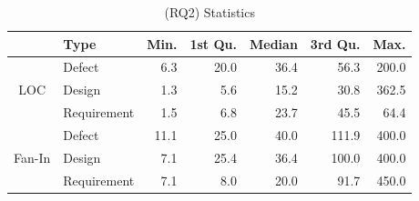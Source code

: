 \begin{table}[tb]
  \caption{(RQ2) Statistics}
  \label{tab:statistic_type}
  \centering

  \begin{tabular}{cl|rrrrr}
  \hline
      &  Type & Min. & 1st Qu. & Median & 3rd Qu. & Max. \\
  \hline
        & Defect    & 6.3 &  20.0 &  36.4  &   56.3 &  200.0 \\
   LOC  & Design & 1.3 &   5.6 &  15.2  &   30.8 & 362.5 \\
        & Requirement  & 1.5 &   6.8 &  23.7  &   45.5 &  64.4 \\
  \hline
        & Defect    & 11.1 &  25.0 &  40.0  & 111.9 & 400.0 \\
Fan-In  & Design & 7.1 &  25.4 &  36.4  &  100.0 &  400.0 \\
        & Requirement  & 7.1 &  8.0 &  20.0  &  91.7 &  450.0 \\
  \hline
  \end{tabular}
\end{table}


